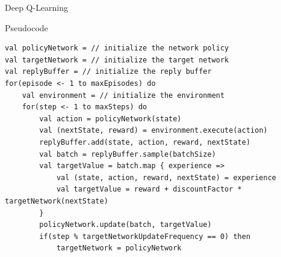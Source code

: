 \documentclass[presentation, 8pt]{beamer}\mode<presentation>{\usetheme{AMSBolognaFC}}
\begin{document}
\begin{frame}{Deep Q-Learning}
	\begin{exampleblock}{Pseudocode}
\begin{lstlisting}[style=scala]
val policyNetwork = // initialize the network policy
val targetNetwork = // initialize the target network
val replyBuffer = // initialize the reply buffer
for(episode <- 1 to maxEpisodes) do
	val environment = // initialize the environment
	for(step <- 1 to maxSteps) do
		val action = policyNetwork(state)
		val (nextState, reward) = environment.execute(action)
		replyBuffer.add(state, action, reward, nextState)
		val batch = replyBuffer.sample(batchSize)
		val targetValue = batch.map { experience =>
			val (state, action, reward, nextState) = experience
			val targetValue = reward + discountFactor * targetNetwork(nextState)
		}
		policyNetwork.update(batch, targetValue)
		if(step % targetNetworkUpdateFrequency == 0) then
			targetNetwork = policyNetwork
		
\end{lstlisting}
	\end{exampleblock}
\end{frame}
\end{document}
